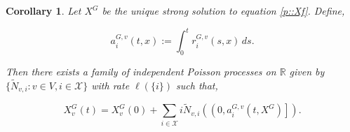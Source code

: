 \documentclass[12pt]{article}
\newcommand{\mb}{\mathbb}
\newcommand{\mc}{\mathcal}
\newcommand{\defeq}{:=}								%
\newcommand{\sta}{\mc{X}}							%
\newcommand{\Xf}{X}									%
\newcommand{\poiss}{N}								%
\newcommand{\Sm}{\ell}								%
\newcommand{\rate}{r}								%
\newcommand{\xf}{x}									%
\newcommand{\vind}[1]{_{#1}}						%
\newcommand{\tme}[1]{(#1)}							%
\newcommand{\gind}[1]{^{#1}}						%
\newcommand{\stpara}[1]{_{#1}}						%
\newcommand{\gvpara}[2]{^{#1,#2}}					%
\newcommand{\tmepro}[2]{(#1,#2)}					%
\newcommand{\compen}{a}								%
\newcommand{\poissvst}[2]{_{#1,#2}}					%
\newcommand{\alt}[1]{\tilde{#1}}					%
\newtheorem{coro}[thms]{Corollary}
\begin{document}
\begin{coro}
Let \(\Xf\gind{G}\) be the unique strong solution to equation \eqref{p::Xf}. Define,

\[\compen\gvpara{G}{v}\stpara{i}\tmepro{t}{\xf} \defeq \int_0^t \rate\gvpara{G}{v}\stpara{i}\tmepro{s}{\xf}\,ds.\]

Then there exists a family of independent Poisson processes on \(\mb{R}\) given by \(\{\alt{\poiss}\poissvst{v}{i}:v \in V,i \in \sta\}\) with rate \(\Sm(\{i\})\) such that,

\begin{equation}
\Xf\gind{G}\vind{v}\tme{t} = \Xf\gind{G}\vind{v}\tme{0} + \sum_{i \in \sta} i\alt{\poiss}\poissvst{v}{i}\left(\left(0,\compen\gvpara{G}{v}\stpara{i}\tmepro{t}{\Xf\gind{G}}\right]\right).
\label{wp::timeeqn}
\end{equation}
\label{wp::timechange}
\end{coro}
\end{document}
